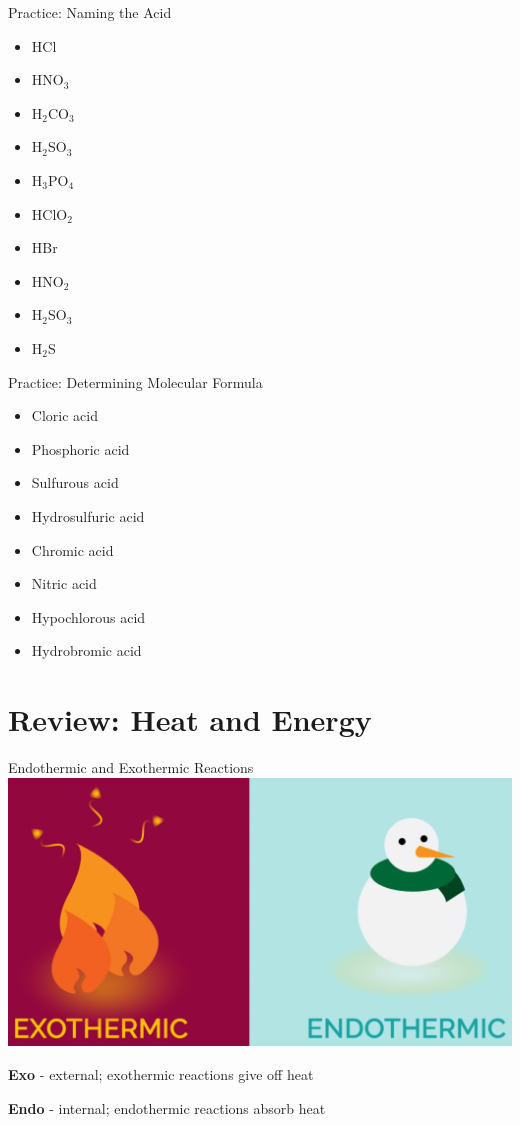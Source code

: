 \documentclass[11pt]{beamer}
\begin{document}
\begin{frame}{Practice: Naming the Acid}
  \begin{itemize}
  \item HCl
  \item HNO$_3$
  \item H$_2$CO$_3$
  \item H$_2$SO$_3$
  \item H$_3$PO$_4$
  \item HClO$_2$
  \item HBr
  \item HNO$_2$
  \item H$_2$SO$_3$
  \item H$_2$S
  \end{itemize}
\end{frame}

\begin{frame}{Practice: Determining Molecular Formula}
  \begin{itemize}
  \item Cloric acid
  \item Phosphoric acid
  \item Sulfurous acid
  \item Hydrosulfuric acid
  \item Chromic acid
  \item Nitric acid
  \item Hypochlorous acid
  \item Hydrobromic acid
  \end{itemize}
\end{frame}

\section{Review: Heat and Energy}

\begin{frame}{Endothermic and Exothermic Reactions}
  \centering
  \includegraphics[width=0.8\linewidth]{exo_endo}

  \textbf{Exo} - external; exothermic reactions give off
  heat

  \textbf{Endo} - internal; endothermic reactions absorb
  heat
\end{frame}
\end{document}
